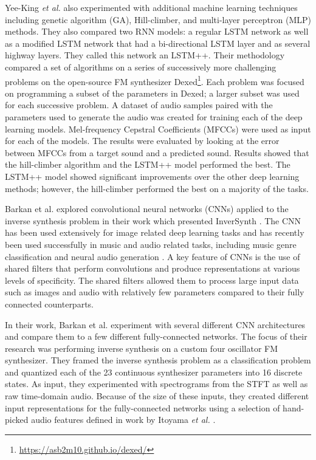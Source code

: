 Yee-King \textit{et al.} also experimented with additional machine learning techniques including genetic algorithm (GA), Hill-climber, and  multi-layer perceptron (MLP) methods. They also compared two RNN models: a regular LSTM network as well as a modified LSTM network that had a bi-directional LSTM layer and as several highway layers. They called this network an LSTM++. Their methodology compared a set of algorithms on a series of successively more challenging problems on the open-source FM synthesizer Dexed\footnote{\url{https://asb2m10.github.io/dexed/}}. Each problem was focused on programming a subset of the parameters in Dexed; a larger subset was used for each successive problem. A dataset of audio samples paired with the parameters used to generate the audio was created for training each of the deep learning models. Mel-frequency Cepstral Coefficients (MFCCs) were used as input for each of the models. The results were evaluated by looking at the error between MFCCs from a target sound and a predicted sound. Results showed that the hill-climber algorithm and the LSTM++ model performed the best. The LSTM++ model showed significant improvements over the other deep learning methods; however, the hill-climber performed the best on a majority of the tasks.

Barkan et al. explored convolutional neural networks (CNNs) applied to the inverse synthesis problem in their work which presented InverSynth \cite{barkan2019deep}. The CNN has been used extensively for image related deep learning tasks and has recently been used successfully in music and audio related tasks, including music genre classification \cite{choi2016automatic} and neural audio generation \cite{donahue2018adversarial}. A key feature of CNNs is the use of shared filters that perform convolutions and produce representations at various levels of specificity. The shared filters allowed them to process large input data such as images and audio with relatively few parameters compared to their fully connected counterparts. 

In their work, Barkan et al. experiment with several different CNN architectures and compare them to a few different fully-connected networks. The focus of their research was performing inverse synthesis on a custom four oscillator FM synthesizer. They framed the inverse synthesis problem as a classification problem and quantized each of the 23 continuous synthesizer parameters into 16 discrete states. As input, they experimented with spectrograms from the STFT as well as raw time-domain audio. Because of the size of these inputs, they created different input representations for the fully-connected networks using a selection of hand-picked audio features defined in work by Itoyama \textit{et al.} \cite{itoyama2014parameter}.

